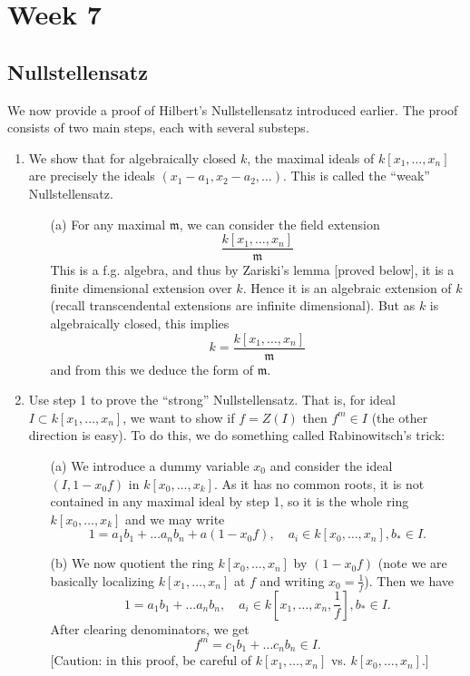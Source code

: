 \section{Week 7}

\subsection{Nullstellensatz}

We now provide a proof of Hilbert's Nullstellensatz introduced earlier. The proof consists of two main steps, each with several substeps.
\begin{enumerate}
    \item We show that for algebraically closed $k$, the maximal ideals of $k[x_1, \dots, x_n]$ are precisely the ideals $(x_1 - a_1, x_2 - a_2, \dots)$. This is called the ``weak'' Nullstellensatz.
    \begin{itemize}
        \item[(a)] For any maximal $\mathfrak m$, we can consider the field extension
        \[
            \frac{k[x_1, \dots, x_n]}{\mathfrak m}
        \]
        This is a f.g. algebra, and thus by Zariski's lemma [proved below], it is a finite dimensional extension over $k$. Hence it is an algebraic extension of $k$ (recall transcendental extensions are infinite dimensional). But as $k$ is algebraically closed, this implies
        \[
            k = \frac{k[x_1, \dots, x_n]}{\mathfrak m}
        \]
        and from this we deduce the form of $\mathfrak m$.
    \end{itemize}
    \item Use step 1 to prove the ``strong'' Nullstellensatz. That is, for ideal $I \subset k[x_1, \dots, x_n]$, we want to show if $f = Z(I)$ then $f^m \in I$ (the other direction is easy). To do this, we do something called Rabinowitsch's trick:
    \begin{itemize}
        \item[(a)] We introduce a dummy variable $x_0$ and consider the ideal $(I, 1 - x_0f)$ in $k[x_0, \dots, x_k]$. As it has no common roots, it is not contained in any maximal ideal by step 1, so it is the whole ring $k[x_0, \dots, x_k]$ and we may write
        \[
            1 = a_1b_1 + \dots a_nb_n + a(1 - x_0f), \quad a_i \in k[x_0, \dots, x_n], b_* \in I.
        \]
        \item[(b)] We now quotient the ring $k[x_0, \dots, x_n]$ by $(1 - x_0f)$ (note we are basically localizing $k[x_1, \dots, x_n]$ at $f$ and writing $x_0 = \frac{1}{f}$). Then we have
        \[
            1 = a_1b_1 + \dots a_nb_n, \quad a_i \in k[x_1, \dots, x_n, \frac{1}{f}], b_* \in I.
        \]
        After clearing denominators, we get
        \[
            f^m = c_1b_1 + \dots c_nb_n \in I.
        \]
        [Caution: in this proof, be careful of $k[x_1, \dots, x_n]$ vs. $k[x_0, \dots, x_n]$.]
    \end{itemize}
\end{enumerate}

